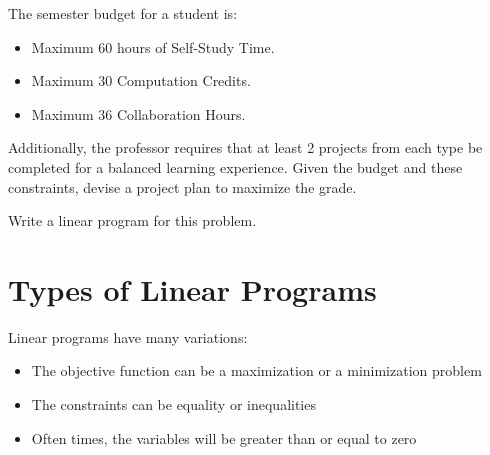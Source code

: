 \documentclass[11  pt]{article}
\begin{document}
The semester budget for a student is:
\begin{itemize}
    \item Maximum 60 hours of Self-Study Time.
    \item Maximum 30 Computation Credits.
    \item Maximum 36 Collaboration Hours.
\end{itemize}

Additionally, the professor requires that at least 2 projects from each type be completed for a balanced learning experience.
Given the budget and these constraints, devise a project plan to maximize the grade. 

\vs{1cm}
Write a linear program for this problem.

\vfill
\newpage

%
%
%

\section{Types of Linear Programs}
Linear programs have many variations:
\begin{itemize}
	\item The objective function can be a maximization or a minimization problem
	\item The constraints can be equality or inequalities
	\item Often times, the variables will be greater than or equal to zero
\end{itemize}
\end{document}
